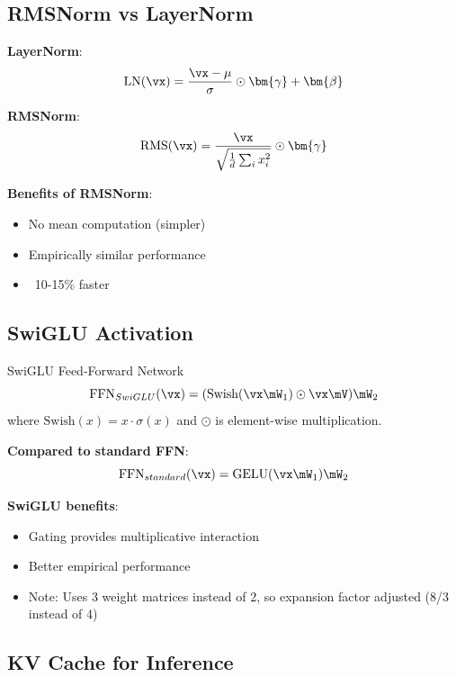 \subsection{RMSNorm vs LayerNorm}

\textbf{LayerNorm}:
\begin{equation}
\text{LN}(\vx) = \frac{\vx - \mu}{\sigma} \odot \bm{\gamma} + \bm{\beta}
\end{equation}

\textbf{RMSNorm}:
\begin{equation}
\text{RMS}(\vx) = \frac{\vx}{\sqrt{\frac{1}{d}\sum_i x_i^2}} \odot \bm{\gamma}
\end{equation}

\textbf{Benefits of RMSNorm}:
\begin{itemize}
    \item No mean computation (simpler)
    \item Empirically similar performance
    \item ~10-15\% faster
\end{itemize}

\subsection{SwiGLU Activation}

\begin{mathresult}{SwiGLU Feed-Forward Network}
\begin{equation}
\text{FFN}_{SwiGLU}(\vx) = (\text{Swish}(\vx\mW_1) \odot \vx\mV) \mW_2
\end{equation}
where $\text{Swish}(x) = x \cdot \sigma(x)$ and $\odot$ is element-wise multiplication.
\end{mathresult}

\textbf{Compared to standard FFN}:
\begin{equation}
\text{FFN}_{standard}(\vx) = \text{GELU}(\vx\mW_1)\mW_2
\end{equation}

\textbf{SwiGLU benefits}:
\begin{itemize}
    \item Gating provides multiplicative interaction
    \item Better empirical performance
    \item Note: Uses 3 weight matrices instead of 2, so expansion factor adjusted (8/3 instead of 4)
\end{itemize}

\subsection{KV Cache for Inference}

